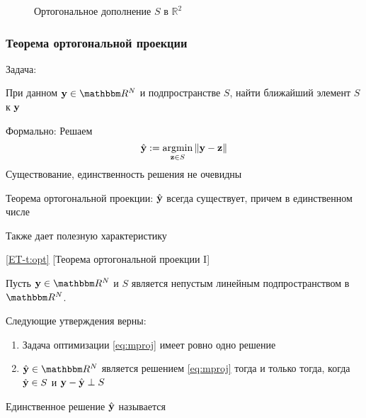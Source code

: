 \begin{frame}

    \vspace{2em}
    \begin{figure}
       \begin{center}
        \resizebox{7.5cm}{!}{}
        \caption{\label{f:orth_comp} Ортогональное дополнение $S$ в $\mathbb{R}^{2}$}
       \end{center}
    \end{figure}
    
\end{frame}

\begin{frame}\frametitle{Теорема ортогональной проекции}
    
    \vspace{2em}
    Задача:
    \begin{center}
        При данном $\boldy \in \RR^N$ и подпространстве $S$, 
        найти ближайший элемент $S$ к ${\mathbf y}$
    \end{center}
    
    Формально: Решаем
    \begin{equation}\label{eq:mproj}
        \hboldy := \argmin_{\boldz \in S} \|\boldy - \boldz\|
    \end{equation}
    Существование, единственность решения не очевидны

    Теорема ортогональной проекции: $\hat {\mathbf y}$ всегда существует, 
    причем в единственном числе

    Также дает полезную характеристику

\end{frame}

\begin{frame}
    
     \vspace{2em}
    \Thm\eqref{ET-t:opt}
    [Теорема ортогональной проекции I]
    
    Пусть $\boldy \in \RR^N$ и $S$ является непустым линейным подпространством в $\RR^N$. 
    
    Следующие утверждения верны:
    \begin{enumerate}
        \item  Задача оптимизации \eqref{eq:mproj} имеет ровно одно решение
        \item $\hboldy \in \RR^N$ является решением \eqref{eq:mproj}
            тогда и только тогда, когда $\hat {{\mathbf y}} \in S$ и 
            ${\mathbf y} - \hat {{\mathbf y}} \perp S$
    \end{enumerate}
    
    \vspace{.7em}
    Единственное решение $\hat {\mathbf y}$ называется 

\end{frame}

